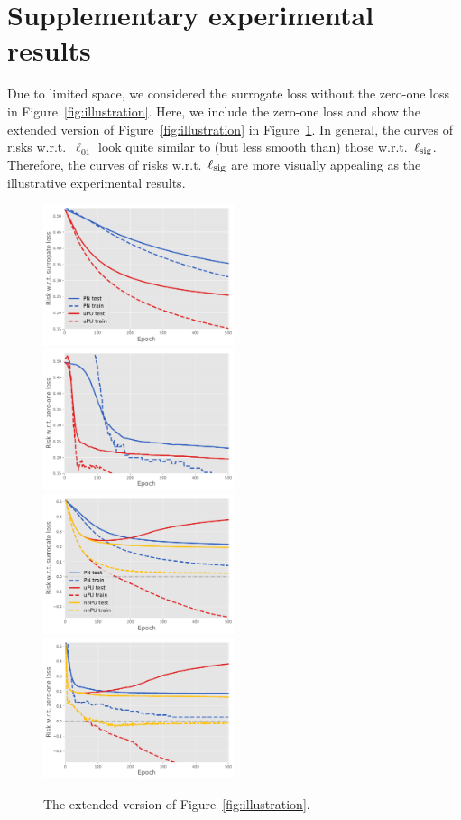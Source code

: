 \section{Supplementary experimental results}
\label{sec:supp-experiment}%

Due to limited space, we considered the surrogate loss without the zero-one loss in Figure~\ref{fig:illustration}. Here, we include the zero-one loss and show the extended version of Figure~\ref{fig:illustration} in Figure~\ref{fig:more-illustration}. In general, the curves of risks w.r.t.\ $\ell_{01}$ look quite similar to (but less smooth than) those w.r.t.\ $\ell_\mathrm{sig}$. Therefore, the curves of risks w.r.t.\ $\ell_\mathrm{sig}$ are more visually appealing as the illustrative experimental results.

\begin{figure}[h]
  {\centering
    {\includegraphics[width=0.5\textwidth]{illustration_surrogate_linear}}%
    {\includegraphics[width=0.5\textwidth]{illustration_zero-one_linear}}\\
    {\includegraphics[width=0.5\textwidth]{illustration_surrogate_mlp}}%
    {\includegraphics[width=0.5\textwidth]{illustration_zero-one_mlp}}}
  \caption{The extended version of Figure~\ref{fig:illustration}.}
  \label{fig:more-illustration}
\end{figure}

